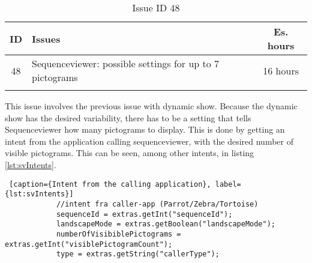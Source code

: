 \begin{longtable} { | c | p{12cm} | c | } 
\hline
	ID 	&	Issues	&		 Es. hours \\\hline
	 48	&	Sequenceviewer: possible settings for up to 7 pictograms	&	16 hours \\\hline
\caption{Issue ID 48}
\label{tab:spr3_SVsettingsupto7pictograms}
\end{longtable}

This issue involves the previous issue with dynamic show. Because the dynamic show has the desired variability, there has to be a setting that tells Sequenceviewer how many pictograms to display. This is done by getting an intent from the application calling sequenceviewer, with the desired number of visible pictograms. This can be seen, among other intents, in listing \ref{lst:svIntents}.

\begin{lstlisting} [caption={Intent from the calling application}, label={lst:svIntents}]
            //intent fra caller-app (Parrot/Zebra/Tortoise)
            sequenceId = extras.getInt("sequenceId");
            landscapeMode = extras.getBoolean("landscapeMode");
            numberOfVisibiblePictograms = extras.getInt("visiblePictogramCount");
            type = extras.getString("callerType");
\end{lstlisting}